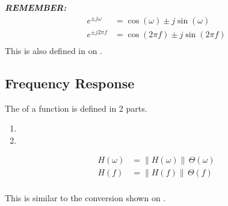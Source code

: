 \begin{definition}
  \begin{remark}\label{rmk:Complex_Exp-Unit_Circle_Relation}
    \textbf{\emph{REMEMBER:}}
    \begin{equation}\label{eq:Complex_Exp-Unit_Circle_Relation}
      \begin{aligned}
        e^{\pm j\omega} &= \cos (\omega) \pm j \sin (\omega) \\
        e^{\pm j 2 \pi f} &= \cos (2 \pi f) \pm j \sin (2 \pi f) \\
      \end{aligned}
    \end{equation}
    This is also defined in  on .
  \end{remark}
\end{definition}

\subsection{Frequency Response}\label{subsec:Fourier_Frequency_Response}
The  of a function is defined in 2 parts.
\begin{enumerate}[noitemsep]
\item {}
\item {}
\end{enumerate}
\begin{equation}\label{eq:Fourier_Frequency_Response}
  \begin{aligned}
    H(\omega) &= \lVert H(\omega) \rVert \, \Theta(\omega) \\
    H(f) &= \lVert H(f) \rVert \, \Theta(f) \\
  \end{aligned}
\end{equation}

\begin{remark*}
  This is similar to the  conversion shown on .
\end{remark*}

